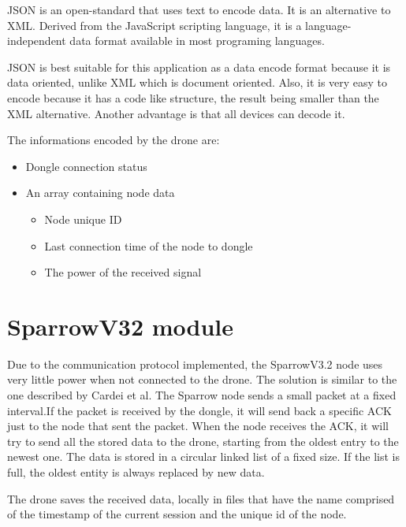 JSON \cite{json} is an open-standard that uses text to encode data. It is an alternative to XML. Derived from the JavaScript scripting language, it is a language-independent data format available in most programing languages.

JSON is best suitable for this application as a data encode format because it is data oriented, unlike XML which is document oriented. Also, it is very easy to encode because it has a code like structure, the result being smaller than the XML alternative. Another advantage is that all devices can decode it. 

The informations encoded by the drone are:
\begin{itemize}

\item Dongle connection status
\item An array containing node data
\begin{itemize}

	\item Node unique ID
	\item Last connection time of the node to dongle
	\item The power of the received signal

	\end{itemize}
\end{itemize}
 

\section{SparrowV32 module}

Due to the communication protocol implemented, the SparrowV3.2 node uses very little power when not connected to
the drone. The solution is similar to the one described by Cardei et al\cite{cardei2005improving}. The Sparrow node sends a small packet at a fixed interval.If the packet is received by the dongle, it will send back a specific ACK just to the node that sent the packet. When the node receives the ACK, it will try to send all the stored data to the drone, starting from the oldest entry to the newest one. The data is stored in a circular linked list of a fixed size. If the list is full, the oldest entity is always replaced by new data.

The drone saves the received data, locally in files that have the name comprised of the timestamp of the current session and the unique id of the node.

